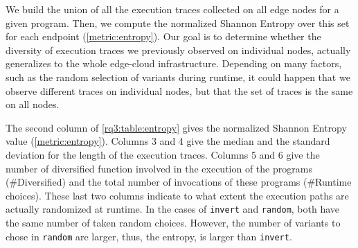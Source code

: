 We build the union of all the execution traces  collected on all edge nodes for a given program. 
Then, we compute the normalized Shannon Entropy over this set for each endpoint (\autoref{metric:entropy}).
Our goal is to determine whether the diversity of execution traces we previously observed on individual nodes, actually generalizes to the whole edge-cloud infrastructure. Depending on many factors, such as the random selection of variants during runtime, it could happen that we observe different traces on individual nodes, but that the set of traces is the same on all nodes.


The second column of \autoref{rq3:table:entropy} gives the normalized Shannon Entropy value (\autoref{metric:entropy}). Columns 3 and 4 give  the median and the standard deviation for the length of the execution traces. Columns 5 and 6 give 
the number of diversified function involved in the execution of the programs (\#Diversified) and the total number of invocations of these programs (\#Runtime choices). These last two columns indicate to what extent the execution paths are actually randomized at runtime. In the cases of \texttt{invert} and \texttt{random}, both have the same number of taken random choices. However, the number of variants to chose in \texttt{random}  are larger, thus, the entropy, is larger than \texttt{invert}.

